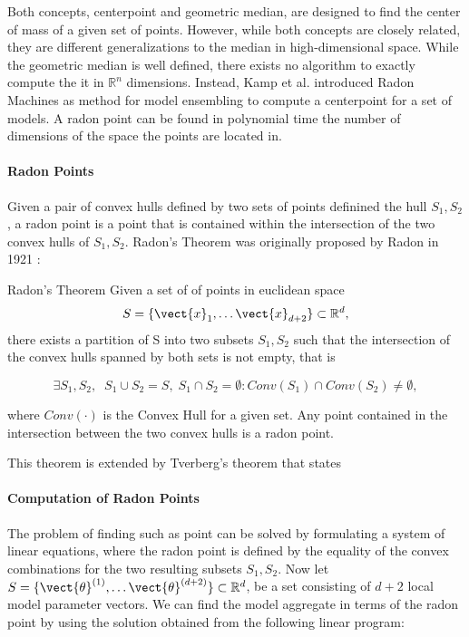Both concepts, centerpoint and geometric median, are designed to find the center of mass of a given set of points.
However, while both concepts are closely related, they are different generalizations to the median in high-dimensional space.
While the geometric median is well defined, there exists no algorithm to exactly compute the it in $\mathbb{R}^n$ dimensions.
Instead, Kamp et al. \cite{kamp2017effective} introduced Radon Machines as method for model ensembling to compute a centerpoint for a set of models.
A radon point can be found in polynomial time \wrt the number of dimensions of the space the points are located in.
\paragraph*{Radon Points}
Given a pair of convex hulls defined by two sets of points definined the hull $S_1, S_2$, a radon point is a point that is contained within the intersection of the two convex hulls of $S_1, S_2$. 
Radon's Theorem was originally proposed by Radon in 1921 \cite{radon1921mengen}:

\begin{threm}[label=thm:radon]{Radon's Theorem}
    Given a set of of points in euclidean space
    \begin{equation}
        S = \{\vect{x}_1, \ldots \vect{x}_{d+2}\} \subset \mathbb{R}^d,
    \end{equation}
   there exists a partition of S into two subsets $S_1, S_2$ such that the intersection of the convex hulls spanned by both sets is not empty, that is
    
    \begin{equation}
        \exists S_1, S_2, \;\; S_1 \cup S_2 = S, \; S_1 \cap S_2 = \emptyset: Conv(S_1) \cap Conv(S_2) \neq \emptyset,
    \end{equation}

    where $Conv(\cdot)$ is the Convex Hull for a given set.
    Any point contained  in the intersection between the two convex hulls is a radon point.
\end{threm}

This theorem is extended by Tverberg's theorem that states 
\paragraph*{Computation of Radon Points}

The problem of finding such as point can be solved by formulating a system of linear equations, where the radon point is defined by the equality of the convex combinations for the two resulting subsets $S_1, S_2$.
Now let $S = \{\vect{\theta}^{(1)}, \ldots \vect{\theta}^{(d+2)}\} \subset \mathbb{R}^d$, be a set consisting of $d+2$ local model parameter vectors.
We can find the model aggregate in terms of the radon point by using the solution obtained from the following linear program:


